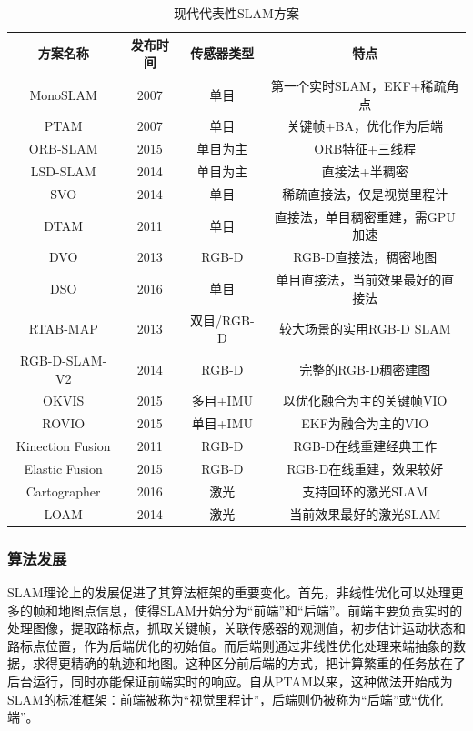 \begin{table}		%
\newcommand{\tabincell}[2]{\begin{tabular}{@{}#1@{}}#2\end{tabular}}		%
\renewcommand\arraystretch{1.5}		%
\centering
\caption{现代代表性SLAM方案\upcite{}}   %
\label{tab1.1}
	\begin{tabular*}{\textwidth}{@{\extracolsep{\fill}}cccc}  %
	\toprule
	方案名称 &发布时间 &传感器类型 &特点 \\
	\midrule
	MonoSLAM	&2007		&单目		&第一个实时SLAM，EKF+稀疏角点		\\
	PTAM		&2007 		&单目		&关键帧+BA，优化作为后端 			\\
	ORB-SLAM	&2015		&单目为主		&ORB特征+三线程 					\\
	LSD-SLAM	&2014		&单目为主 	&直接法+半稠密 					\\
	SVO			&2014		&单目		&稀疏直接法，仅是视觉里程计 		\\
	DTAM		&2011		&单目		&直接法，单目稠密重建，需GPU加速	\\
	DVO			&2013		&RGB-D		&RGB-D直接法，稠密地图				\\
	DSO			&2016		&单目		&单目直接法，当前效果最好的直接法	\\
	RTAB-MAP	&2013		&双目/RGB-D	&较大场景的实用RGB-D SLAM			\\
	RGB-D-SLAM-V2 &2014		&RGB-D		&完整的RGB-D稠密建图				\\
	OKVIS		&2015		&多目+IMU	&以优化融合为主的关键帧VIO			\\
	ROVIO		&2015		&单目+IMU	&EKF为融合为主的VIO				\\
	Kinection Fusion &2011	&RGB-D		&RGB-D在线重建经典工作				\\
	Elastic Fusion &2015	&RGB-D		&RGB-D在线重建，效果较好			\\
	Cartographer	&2016	&激光		&支持回环的激光SLAM				\\
	LOAM		&2014		&激光		&当前效果最好的激光SLAM			\\				
	\bottomrule
	\end{tabular*}
\end{table}

\subsubsection*{算法发展}
SLAM理论上的发展促进了其算法框架的重要变化。首先，非线性优化可以处理更多的帧和地图点信息，使得SLAM开始分为“前端”和“后端”。前端主要负责实时的处理图像，提取路标点，抓取关键帧，关联传感器的观测值，初步估计运动状态和路标点位置，作为后端优化的初始值。而后端则通过非线性优化处理来端抽象的数据，求得更精确的轨迹和地图。这种区分前后端的方式，把计算繁重的任务放在了后台运行，同时亦能保证前端实时的响应。自从PTAM以来，这种做法开始成为SLAM的标准框架：前端被称为“视觉里程计”\upcite{}，后端则仍被称为“后端”或“优化端”。

